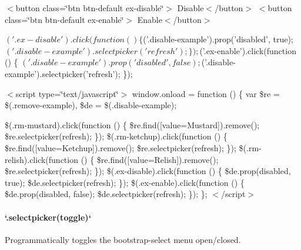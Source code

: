  $<$button class=\char`\"{}btn btn-\/default ex-\/disable\char`\"{}$>${\itshape } Disable$<$/button$>$ $<$button class=\char`\"{}btn btn-\/default ex-\/enable\char`\"{}$>${\itshape } Enable$<$/button$>$ 


\begin{DoxyCode}
$('.ex-disable').click(function () \{
  $('.disable-example').prop('disabled', true);
  $('.disable-example').selectpicker('refresh');
\});

$('.ex-enable').click(function () \{
  $('.disable-example').prop('disabled', false);
  $('.disable-example').selectpicker('refresh');
\});
\end{DoxyCode}


$<$script type=\char`\"{}text/javascript\char`\"{}$>$ window.\+onload = function () \{ var \$re = \$(\textquotesingle{}.remove-\/example\textquotesingle{}), \$de = \$(\textquotesingle{}.disable-\/example\textquotesingle{});

\$(\textquotesingle{}.rm-\/mustard\textquotesingle{}).click(function () \{ \$re.\+find(\textquotesingle{}\mbox{[}value=Mustard\mbox{]}\textquotesingle{}).remove(); \$re.\+selectpicker(\textquotesingle{}refresh\textquotesingle{}); \}); \$(\textquotesingle{}.rm-\/ketchup\textquotesingle{}).click(function () \{ \$re.\+find(\textquotesingle{}\mbox{[}value=Ketchup\mbox{]}\textquotesingle{}).remove(); \$re.\+selectpicker(\textquotesingle{}refresh\textquotesingle{}); \}); \$(\textquotesingle{}.rm-\/relish\textquotesingle{}).click(function () \{ \$re.\+find(\textquotesingle{}\mbox{[}value=Relish\mbox{]}\textquotesingle{}).remove(); \$re.\+selectpicker(\textquotesingle{}refresh\textquotesingle{}); \}); \$(\textquotesingle{}.ex-\/disable\textquotesingle{}).click(function () \{ \$de.\+prop(\textquotesingle{}disabled\textquotesingle{}, true); \$de.\+selectpicker(\textquotesingle{}refresh\textquotesingle{}); \}); \$(\textquotesingle{}.ex-\/enable\textquotesingle{}).click(function () \{ \$de.\+prop(\textquotesingle{}disabled\textquotesingle{}, false); \$de.\+selectpicker(\textquotesingle{}refresh\textquotesingle{}); \}); \}; $<$/script$>$ 



\paragraph*{`.selectpicker(\textquotesingle{}toggle\textquotesingle{})`}

Programmatically toggles the bootstrap-\/select menu open/closed.


 



